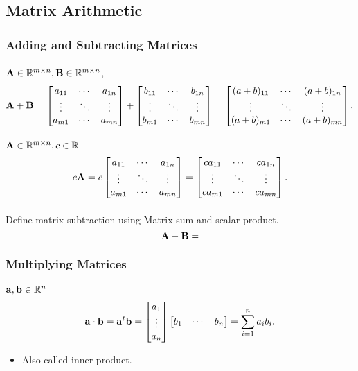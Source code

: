 \documentclass[../../main.tex]{subfiles}
\begin{document}
\subsection{Matrix Arithmetic}

\subsubsection{Adding and Subtracting Matrices}
\paragraph{ }
$\bA \in \fR^{m \times n}, \bB \in \fR^{m \times n}$, 
\begin{equation*}
    \bA + \bB = \printmatsq{a} + \printmatsq{b} = \printmatsq{(a+b)}.
\end{equation*}

\paragraph{ }
$\bA \in \fR^{m \times n}, c \in \fR$ 
\begin{equation*}
    c\bA = c \printmatsq{a} = \printmatsq{c a}.
\end{equation*}

\paragraph{ }
Define matrix subtraction using Matrix sum and scalar product. 
\begin{equation*}
    \bA - \bB = 
\end{equation*}



\subsubsection{Multiplying Matrices}

\paragraph{ }
$\ba, \bb \in \fR^{n}$
\begin{equation}
    \ba  \cdot \bb = \ba^t \bb = \printcolvec{a} \printrowvec{b} = \sum_{i=1}^{n} a_{i} b_{i}.
\end{equation}
\begin{itemize}
    \item Also called inner product.
\end{itemize}
\end{document}
